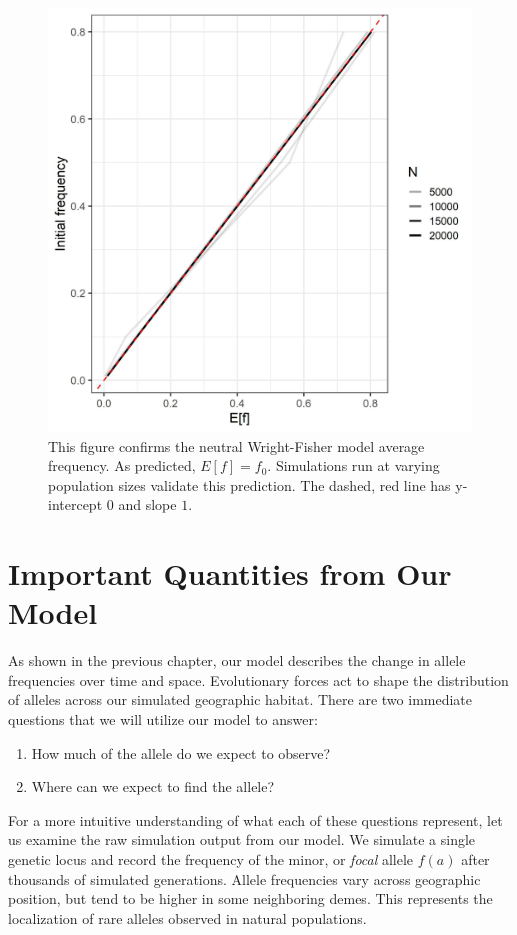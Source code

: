 \begin{figure}[H]
    \centering
    \includegraphics[scale=0.5]{img/mean_f.jpg}
    \caption{This figure confirms the neutral Wright-Fisher model average frequency. As predicted, $E[f] = f_0$. Simulations run at varying population sizes validate this prediction. The dashed, red line has y-intercept $0$ and slope $1$.}
    \label{fig:mean_wf}
\end{figure}


\section{Important Quantities from Our Model}
As shown in the previous chapter, our model describes the change in allele frequencies over time and space. Evolutionary forces act to shape the distribution of alleles across our simulated geographic habitat. There are two immediate questions that we will utilize our model to answer:

\begin{enumerate}
    \item How much of the allele do we expect to observe?
    \item Where can we expect to find the allele?
\end{enumerate}


For a more intuitive understanding of what each of these questions represent, let us examine the raw simulation output from our model. We simulate a single genetic locus and record the frequency of the minor, or \textit{focal} allele $f(a)$ after thousands of simulated generations. Allele frequencies vary across geographic position, but tend to be higher in some neighboring demes. This represents the localization of rare alleles observed in natural populations. \cite{1k_genomes} \cite{geerlings_geographic_2018} \cite{marcus_visualizing_2017} 


